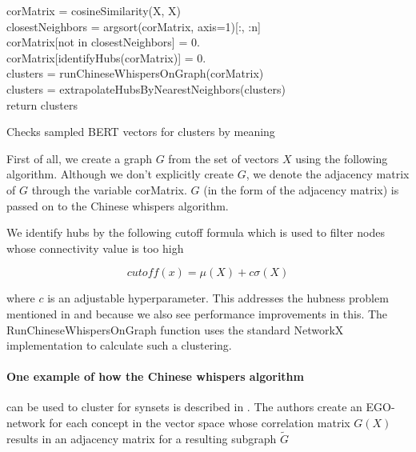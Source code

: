 \documentclass[a4paper,12pt,twoside,openright]{report}
\begin{document}
\begin{algorithm}[H]
\SetAlgoLined
{}

corMatrix = cosineSimilarity(X, X) \\
closestNeighbors = argsort(corMatrix, axis=1)[:, :n] \\
corMatrix[not in closestNeighbors] = 0. \\

corMatrix[identifyHubs(corMatrix)] = 0. \\

clusters = runChineseWhispersOnGraph(corMatrix) \\

clusters = extrapolateHubsByNearestNeighbors(clusters) \\

return clusters

 \caption{Checks sampled BERT vectors for clusters by  meaning}
\end{algorithm}

First of all, we create a graph $G$ from the set of vectors $X$ using the following algorithm.
Although we don't explicitly create $G$, we denote the adjacency matrix of $G$ through the variable corMatrix.
$G$ (in the form of the adjacency matrix) is passed on to the Chinese whispers algorithm.


We identify hubs by the following cutoff formula which is used to filter nodes whose connectivity value is too high

\begin{equation}
cutoff(x) = \mu ( X ) + c \sigma (X)
\end{equation}

where $c$ is an adjustable hyperparameter.
This addresses the hubness problem mentioned in \cite{conneau17} and because we also see performance improvements in this.
The RunChineseWhispersOnGraph function uses the standard NetworkX implementation \cite{hagberg04} to calculate such a clustering.

\paragraph{One example of how the Chinese whispers algorithm}  can be used to cluster for synsets is described in \cite{pelevina16}.
The authors create an EGO-network for each concept in the vector space whose correlation matrix $G(X)$ results in an adjacency matrix for a resulting subgraph $\tilde{G}$
\end{document}
